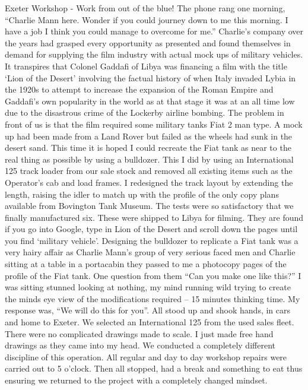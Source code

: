 Exeter Workshop - Work from out of the blue!  The phone rang one morning,
``Charlie Mann here.  Wonder if you could journey down to me this morning.   I
have a job I think you could manage to overcome for me.''  Charlie's company
over the years had grasped every opportunity as presented and found themselves
in demand for supplying the film industry with actual mock ups of military
vehicles.  It transpires that Colonel Gaddafi of Libya was financing a film
with the title ‘Lion of the Desert' involving the factual history of when Italy
invaded Lybia in the 1920s to attempt to increase the expansion of the Roman
Empire and Gaddafi's own popularity in the world as at that stage it was at an
all time low due to the disastrous crime of the Lockerby airline bombing.  The
problem in front of us is that the film required some military tanks Fiat 2 man
type.  A mock up  had been made from a Land Rover but failed as the wheels had
sunk in the desert sand.  This time it is hoped I could recreate the Fiat tank
as near to the real thing as possible by using a bulldozer.  This I did by
using an International 125 track loader from our sale stock and removed all
existing items such as the Operator's cab and load frames.  I redesigned the
track layout by extending the length, raising the idler to match up with the
profile of the only copy plans available from Bovington Tank Museum.  The tests
were so satisfactory that we finally manufactured six.  These were shipped to
Libya for filming.  They are found if you go into Google, type in Lion of the
Desert and scroll down the pages until you find ‘military vehicle'.  Designing
the bulldozer to replicate a Fiat tank was a very hairy affair as Charlie
Mann's group of very serious faced men and Charlie sitting at a table in a
portacabin they passed to me a photocopy pages of the profile of the Fiat tank.
One question from them ``Can you make one like this?''  I was sitting stunned
looking at nothing, my mind running wild trying to create the minds eye view of
the modifications required – 15 minutes thinking time.  My response was, ``We
will do this for you''.  All stood up and shook hands, in cars and home to
Exeter.  We selected an International 125 from the used sales fleet. There were
no complicated drawings made to scale.  I just made free hand drawings as they
came into my head.  We conducted a completely different discipline of this
operation.   All regular and day to day workshop repairs were carried out to 5
o'clock.  Then all stopped, had a break and something to eat thus ensuring we
returned to the project with a completely changed mindset.

